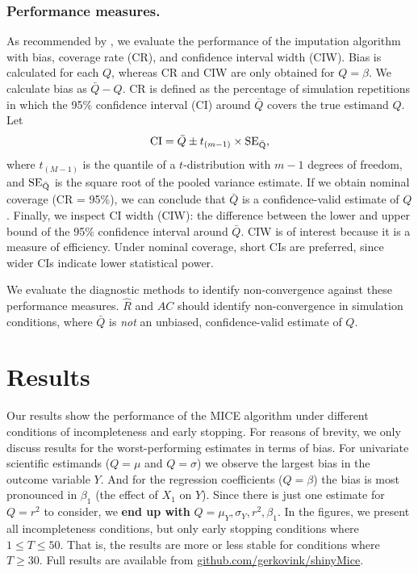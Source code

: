 \documentclass[Royal,times,sageh]{sagej}
\begin{document}
\hypertarget{performance-measures.}{%
\subsubsection{Performance measures.}\label{performance-measures.}}

As recommended by \citet{buur18}, we evaluate the performance of the imputation algorithm with bias, coverage rate (CR), and confidence interval width (CIW). Bias is calculated for each \(Q\), whereas CR and CIW are only obtained for \(Q = \beta\). We calculate bias as \(\bar{Q} - Q\). CR is defined as the percentage of simulation repetitions in which the 95\% confidence interval (CI) around \(\bar{Q}\) covers the true estimand \(Q\). Let
\[\text{CI} = \bar{Q} \pm t_{(m-1)} \times \rm SE_{\bar{Q}},\]
where \(t_{(M-1)}\) is the quantile of a \(t\)-distribution with \(m-1\) degrees of freedom, and \(\rm SE_{\bar{Q}}\) is the square root of the pooled variance estimate. If we obtain nominal coverage (CR = 95\%), we can conclude that \(\bar{Q}\) is a confidence-valid estimate of \(Q\). Finally, we inspect CI width (CIW): the difference between the lower and upper bound of the 95\% confidence interval around \(\bar{Q}\). CIW is of interest because it is a measure of efficiency. Under nominal coverage, short CIs are preferred, since wider CIs indicate lower statistical power.

We evaluate the diagnostic methods to identify non-convergence against these performance measures. \(\widehat{R}\) and \(AC\) should identify non-convergence in simulation conditions, where \(\bar{Q}\) is \emph{not} an unbiased, confidence-valid estimate of \(Q\).

\hypertarget{results}{%
\section{Results}\label{results}}

Our results show the performance of the MICE algorithm under different conditions of incompleteness and early stopping. For reasons of brevity, we only discuss results for the worst-performing estimates in terms of bias. For univariate scientific estimands (\(Q=\mu\) and \(Q=\sigma\)) we observe the largest bias in the outcome variable \(Y\). And for the regression coefficients (\(Q=\beta\)) the bias is most pronounced in \(\beta_1\) (the effect of \(X_1\) on \(Y\)). Since there is just one estimate for \(Q=r^2\) to consider, we \textbf{end up with} \(Q=\mu_Y, \sigma_Y,r^2, \beta_1\). In the figures, we present all incompleteness conditions, but only early stopping conditions where \(1 \leq T\leq50\). That is, the results are more or less stable for conditions where \(T \geq 30\). Full results are available from \href{https://github.com/gerkovink/shinyMice/tree/master/3.Thesis/}{github.com/gerkovink/shinyMice}.
\end{document}
